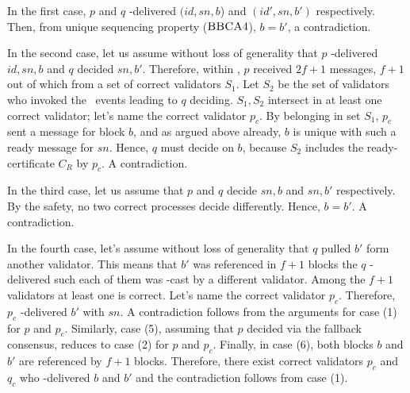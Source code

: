 In the first case, $p$ and $q$ \primitivesmall-delivered $(id, sn, b$) and $(id', sn, b')$ respectively.
Then, from \primitive unique sequencing property ($\textsc{BBCA}4$), $b=b'$, a contradiction.

In the second case, let us assume without loss of generality that $p$ \primitivesmall-delivered $id, sn, b$ and $q$ decided $sn,b'$.
Therefore, within \primitive, $p$ received $2f+1$ \ready messages, $f+1$ out of which from a set of correct validators $S_1$.
Let $S_2$ be the set of validators who invoked the \bbcaabort\ events leading to $q$ deciding.
$S_1, S_2$ intersect in at least one correct validator; let's name the correct validator $p_c$.
By belonging in set $S_1$, $p_c$ sent a \ready message for block $b$,
and as argued above already, $b$ is unique with such a ready message for $sn$.
Hence, $q$ must decide on $b$, because $S_2$ includes the ready-certificate $C_{R}$ by $p_c$.
A contradiction.

In the third case, let us assume that $p$ and $q$ decide  $sn, b$ and $sn, b'$ respectively.
By the \vbc safety, no two correct processes decide differently.
Hence, $b=b'$. A contradiction. 

In the fourth case, let's assume without loss of generality that $q$ pulled $b'$ form another validator.
This means that $b'$ was referenced in $f+1$ blocks the $q$ \primitivesmall-delivered such each of them was \primitivesmall-cast by a different validator.
Among the $f+1$ validators at least one is correct. Let's name the correct validator $p_c$.
Therefore, $p_c$ \primitivesmall-delivered $b'$ with $sn$. 
A contradiction follows from the arguments for case (1) for $p$ and $p_c$.
Similarly, case (5), assuming that $p$ decided via the fallback consensus, reduces to case (2) for $p$ and $p_c$.
Finally, in case (6), both blocks $b$ and $b'$ are referenced by $f+1$ blocks.
Therefore, there exist correct validators $p_c$ and $q_c$ who \primitivesmall-delivered $b$ and $b'$ and the contradiction follows from case (1).



